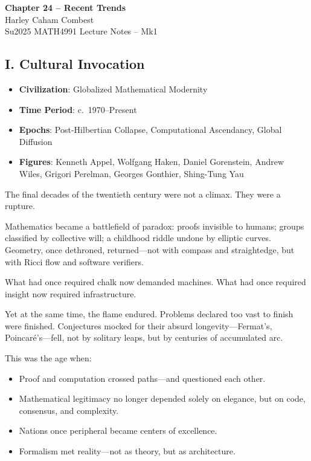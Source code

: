 \documentclass[9pt]{article}
\begin{document}
\begin{center}
\Large\textbf{Chapter 24 – Recent Trends} \\
\large Harley Caham Combest \\
\large Su2025 MATH4991 Lecture Notes – Mk1
\end{center}

\vspace{1em}

\subsection*{I. Cultural Invocation}

\begin{itemize}
  \item \textbf{Civilization}: Globalized Mathematical Modernity
  \item \textbf{Time Period}: c.\ 1970--Present
  \item \textbf{Epochs}: Post-Hilbertian Collapse, Computational Ascendancy, Global Diffusion
  \item \textbf{Figures}: Kenneth Appel, Wolfgang Haken, Daniel Gorenstein, Andrew Wiles, Grigori Perelman, Georges Gonthier, Shing-Tung Yau
\end{itemize}

The final decades of the twentieth century were not a climax. They were a rupture.

Mathematics became a battlefield of paradox: proofs invisible to humans; groups classified by collective will; a childhood riddle undone by elliptic curves. Geometry, once dethroned, returned---not with compass and straightedge, but with Ricci flow and software verifiers.

What had once required chalk now demanded machines. What had once required insight now required infrastructure.

Yet at the same time, the flame endured. Problems declared too vast to finish were finished. Conjectures mocked for their absurd longevity---Fermat’s, Poincaré’s---fell, not by solitary leaps, but by centuries of accumulated arc.

\medskip

This was the age when:
\begin{itemize}
  \item Proof and computation crossed paths---and questioned each other.
  \item Mathematical legitimacy no longer depended solely on elegance, but on code, consensus, and complexity.
  \item Nations once peripheral became centers of excellence.
  \item Formalism met reality---not as theory, but as architecture.
\end{itemize}
\end{document}
